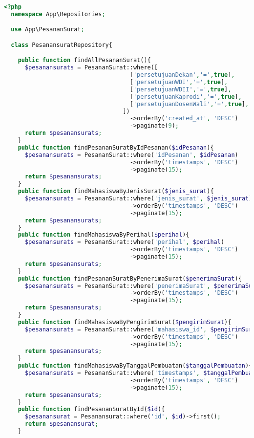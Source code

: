 \begin{lstlisting}[language=php, caption=PesanansuratRepository.php]
	<?php
  namespace App\Repositories;

  use App\PesananSurat;

  class PesanansuratRepository{

    public function findAllPesananSurat(){
      $pesanansurats = PesananSurat::where([
                                    ['persetujuanDekan','=',true],
                                    ['persetujuanWDI','=',true],
                                    ['persetujuanWDII','=',true],
                                    ['persetujuanKaprodi','=',true],
                                    ['persetujuanDosenWali','=',true],
                                  ])
                                    ->orderBy('created_at', 'DESC')
                                    ->paginate(9);
      return $pesanansurats;
    }
    public function findPesananSuratByIdPesanan($idPesanan){
      $pesanansurats = PesananSurat::where('idPesanan', $idPesanan)
                                    ->orderBy('timestamps', 'DESC')
                                    ->paginate(15);
      return $pesanansurats;
    }
    public function findMahasiswaByJenisSurat($jenis_surat){
      $pesanansurats = PesananSurat::where('jenis_surat', $jenis_surat)
                                    ->orderBy('timestamps', 'DESC')
                                    ->paginate(15);
      return $pesanansurats;
    }
    public function findMahasiswaByPerihal($perihal){
      $pesanansurats = PesananSurat::where('perihal', $perihal)
                                    ->orderBy('timestamps', 'DESC')
                                    ->paginate(15);
      return $pesanansurats;
    }
    public function findPesananSuratByPenerimaSurat($penerimaSurat){
      $pesanansurats = PesananSurat::where('penerimaSurat', $penerimaSurat)
                                    ->orderBy('timestamps', 'DESC')
                                    ->paginate(15);
      return $pesanansurats;
    }
    public function findMahasiswaByPengirimSurat($pengirimSurat){
      $pesanansurats = PesananSurat::where('mahasiswa_id', $pengirimSurat)
                                    ->orderBy('timestamps', 'DESC')
                                    ->paginate(15);
      return $pesanansurats;
    }
    public function findMahasiswaByTanggalPembuatan($tanggalPembuatan){
      $pesanansurats = PesananSurat::where('timestamps', $tanggalPembuatan)
                                    ->orderBy('timestamps', 'DESC')
                                    ->paginate(15);
      return $pesanansurats;
    }
    public function findPesananSuratById($id){
      $pesanansurat = Pesanansurat::where('id', $id)->first();
      return $pesanansurat;
    }


\end{lstlisting}
